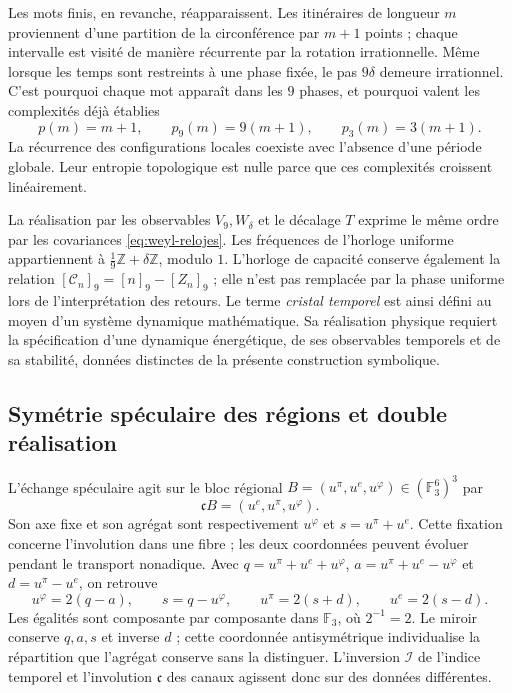 Les mots finis, en revanche, réapparaissent. Les itinéraires de longueur \(m\)
proviennent d'une partition de la circonférence par \(m+1\) points ; chaque
intervalle est visité de manière récurrente par la rotation irrationnelle. Même
lorsque les temps sont restreints à une phase fixée, le pas \(9\delta\) demeure
irrationnel. C'est pourquoi chaque mot apparaît dans les
\(9\) phases, et pourquoi valent les complexités déjà établies
\[
 p(m)=m+1,\qquad p_9(m)=9(m+1),\qquad p_3(m)=3(m+1).
\]
La récurrence des configurations locales coexiste avec l'absence d'une
période globale. Leur entropie topologique est nulle parce que ces complexités
croissent linéairement.

La réalisation par les observables \(V_9,W_\delta\) et le décalage
\(T\) exprime le même ordre par les covariances
\eqref{eq:weyl-relojes}. Les fréquences de l'horloge uniforme appartiennent à
\(\frac19\mathbb Z+\delta\mathbb Z\), modulo \(1\). L'horloge de
capacité conserve également la relation
\([\mathcal C_n]_9=[n]_9-[Z_n]_9\) ; elle n'est pas remplacée par la phase uniforme
lors de l'interprétation des retours. Le terme \emph{cristal temporel} est ainsi
défini au moyen d'un système dynamique mathématique. Sa réalisation physique
requiert la spécification d'une dynamique énergétique, de ses observables temporels
et de sa stabilité, données distinctes de la présente construction symbolique.

\subsection{Symétrie spéculaire des régions et double réalisation}
\label{mono-ampl:regiones}

L'échange spéculaire agit sur le bloc régional
\(B=(u^\pi,u^e,u^\varphi)\in(\mathbb F_3^6)^3\) par
\[
 \mathfrak cB=(u^e,u^\pi,u^\varphi).
\]
Son axe fixe et son agrégat sont respectivement \(u^\varphi\) et
\(s=u^\pi+u^e\). Cette fixation concerne l'involution dans une fibre ;
les deux coordonnées peuvent évoluer pendant le transport nonadique.
Avec \(q=u^\pi+u^e+u^\varphi\),
\(a=u^\pi+u^e-u^\varphi\) et \(d=u^\pi-u^e\), on retrouve
\[
 u^\varphi=2(q-a),\qquad s=q-u^\varphi,\qquad
 u^\pi=2(s+d),\qquad u^e=2(s-d).
\]
Les égalités sont composante par composante dans \(\mathbb F_3\), où
\(2^{-1}=2\). Le miroir conserve \(q,a,s\) et inverse \(d\) ; cette
coordonnée antisymétrique individualise la répartition que l'agrégat conserve
sans la distinguer. L'inversion \(\mathcal I\) de l'indice temporel et
l'involution \(\mathfrak c\) des canaux agissent donc sur des
données différentes.

